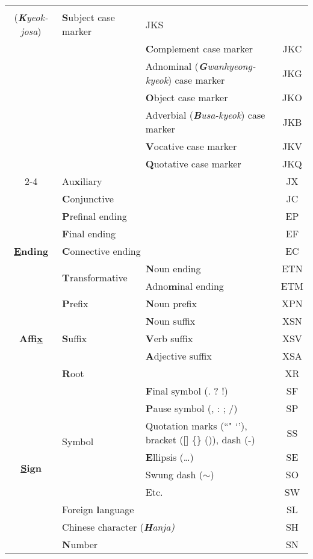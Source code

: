 \begin{table*}[tbh!]
{\begin{tabular}{cllc}
{    \makecell*{Case marker \\ (\textit{\textbf{K}yeok-josa})}} 
     & \textbf{S}ubject case marker & JKS \\
     &  & \textbf{C}omplement case marker & JKC \\
     &  & Adnominal (\textit{\textbf{G}wanhyeong-kyeok}) case marker & JKG \\
     &  & \textbf{O}bject case marker & JKO \\
     &  & Adverbial (\textit{\textbf{B}usa-kyeok}) case marker & JKB \\
     &  & \textbf{V}ocative case marker & JKV \\
     &  & \textbf{Q}uotative case marker & JKQ \\
     \cmidrule(l){2-4} 
     & Au\textbf{x}iliary && JX \\
     & \textbf{C}onjunctive && JC \\
    \midrule
    \multirow{5}{*}{\textbf{\underline{E}nding}} & \multicolumn{2}{l}{\textbf{P}refinal ending} & EP \\
     & \multicolumn{2}{l}{\textbf{F}inal ending} & EF \\
     & \multicolumn{2}{l}{\textbf{C}onnective ending}& EC \\
     \cmidrule(l){2-4}
     & \multirow{2}{*}{\textbf{T}ransformative} & \textbf{N}oun ending & ETN \\
     & & Adno\textbf{m}inal ending & ETM \\
    \midrule
    \multirow{5}{*}{\textbf{Affi\underline{x}}} & \textbf{P}refix & \textbf{N}oun prefix & XPN \\
     \cmidrule(l){2-4} 
     & \multirow{3}{*}{\textbf{S}uffix} & \textbf{N}oun suffix & XSN \\
     &  & \textbf{V}erb suffix & XSV \\
     &  & \textbf{A}djective suffix & XSA \\
     \cmidrule(l){2-4} 
     & \textbf{R}oot && XR \\
    \midrule
    \multirow{9}{*}{\textbf{\underline{S}ign}} & \multirow{6}{*}{Symbol} & \textbf{F}inal symbol (. ? !) & SF \\
     && \textbf{P}ause symbol (, : ; /) & SP \\
     && Quotation marks (``" `'), bracket ({[}{]} \{\} ()), dash (-) & SS \\
     && \textbf{E}llipsis (…) & SE \\
     && Swung dash ($\sim$) & SO \\
     && Etc. & SW \\
     \cmidrule(l){2-4} 
     & Foreign \textbf{l}anguage && SL \\
     & \multicolumn{2}{l}{Chinese character (\textit{\textbf{H}anja)}} & SH \\
     & \textbf{N}umber && SN \\ 
     \bottomrule
\end{tabular}
}
\label{tb:postag}
\end{table*}

